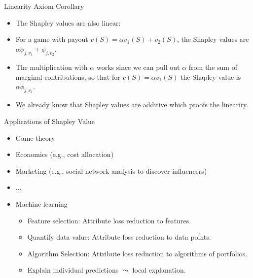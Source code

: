 \documentclass[aspectratio=169]{../latex_main/tntbeamer}  %
\begin{document}
\begin{frame}{Linearity Axiom Corollary}
  \begin{itemize}
  \item The Shapley values are also linear:
  \item For a game with payout $v(S) = \alpha v_1(S) + v_2(S)$, the Shapley values are $\alpha \phi_{j,v_1} + \phi_{j,v_2}$.
  \item The multiplication with $\alpha$ works since we can pull out $\alpha$ from the sum of marginal contributions, so that for $v(S) = \alpha v_1(S)$ the Shapley value is $\alpha \phi_{j,v_1}$.
  \item We already know that Shapley values are additive which proofs the linearity.
  \end{itemize}
\end{frame}



\begin{frame}{Applications of Shapley Value}

  \begin{itemize}
      \item Game theory
      \item Economics (e.g., cost allocation) 
      \item Marketing (e.g., social network analysis to discover influencers) 
      \item ...
      \item Machine learning
       \begin{itemize}
         \item Feature selection: Attribute loss reduction to features. 
         \item Quantify data value: Attribute loss reduction to data points. 
         \item Algorithm Selection: Attribute loss reduction to algorithms of portfolios. 
         \item \alert{Explain individual predictions} $\leadsto$ local explanation.
       \end{itemize}
  \end{itemize}

\end{frame}
\end{document}
